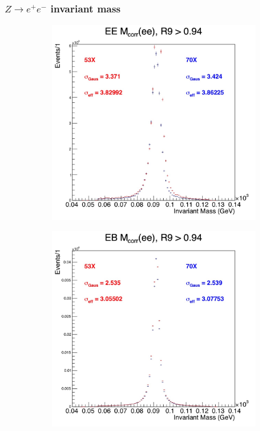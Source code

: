 \documentclass[10pt]{article}
\begin{document}
\subsubsection{$Z\rightarrow e^+ e^-$ invariant mass }
\begin{figure}[h]
        \centering
        \begin{subfigure}[b]{0.35\textwidth}
                \includegraphics[width=\textwidth]{fullRunPlots/Zee_corr_1}
                \caption{}
        \end{subfigure}
         \begin{subfigure}[b]{0.35\textwidth}
                \includegraphics[width=\textwidth]{fullRunPlots/Zee_corr_2}

\end{subfigure}
\end{figure}
\end{document}
